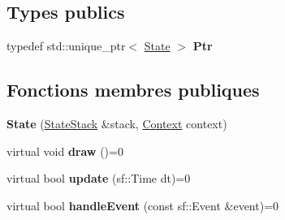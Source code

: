 \subsection*{Types publics}
\begin{DoxyCompactItemize}
\item 
typedef std\+::unique\+\_\+ptr$<$ \hyperlink{class_state}{State} $>$ {\bfseries Ptr}\hypertarget{class_state_a71d9930be1a58be7f711e245b7965d48}{}\label{class_state_a71d9930be1a58be7f711e245b7965d48}

\end{DoxyCompactItemize}
\subsection*{Fonctions membres publiques}
\begin{DoxyCompactItemize}
\item 
{\bfseries State} (\hyperlink{class_state_stack}{State\+Stack} \&stack, \hyperlink{struct_state_1_1_context}{Context} context)\hypertarget{class_state_afede488ff3c1b264bbd07f8aeead84a7}{}\label{class_state_afede488ff3c1b264bbd07f8aeead84a7}

\item 
virtual void {\bfseries draw} ()=0\hypertarget{class_state_ae261605bc40b7e3959ce5df5457e4942}{}\label{class_state_ae261605bc40b7e3959ce5df5457e4942}

\item 
virtual bool {\bfseries update} (sf\+::\+Time dt)=0\hypertarget{class_state_acd5926bc7a373edff9e57f3ffe94ca13}{}\label{class_state_acd5926bc7a373edff9e57f3ffe94ca13}

\item 
virtual bool {\bfseries handle\+Event} (const sf\+::\+Event \&event)=0\hypertarget{class_state_a19965f83460b248c42952aac8d001206}{}\label{class_state_a19965f83460b248c42952aac8d001206}

\end{DoxyCompactItemize}
